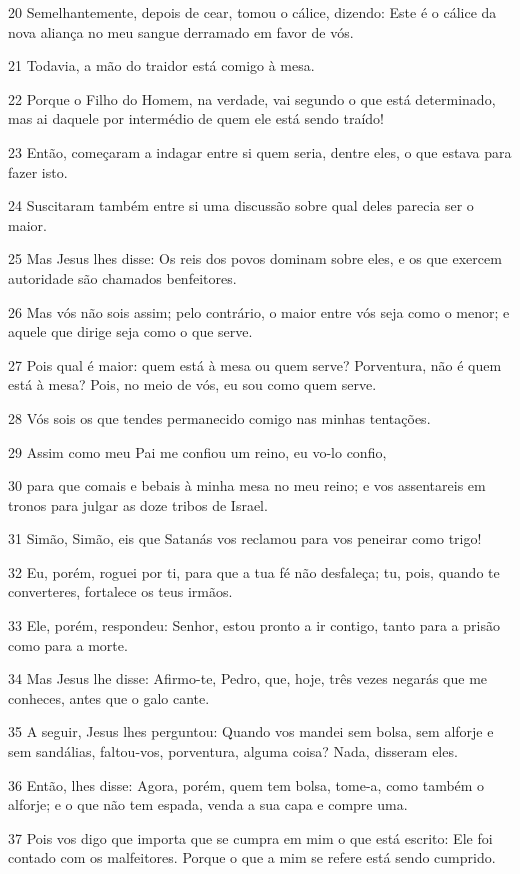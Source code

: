 \par 20 Semelhantemente, depois de cear, tomou o cálice, dizendo: Este é o cálice da nova aliança no meu sangue derramado em favor de vós.
\par 21 Todavia, a mão do traidor está comigo à mesa.
\par 22 Porque o Filho do Homem, na verdade, vai segundo o que está determinado, mas ai daquele por intermédio de quem ele está sendo traído!
\par 23 Então, começaram a indagar entre si quem seria, dentre eles, o que estava para fazer isto.
\par 24 Suscitaram também entre si uma discussão sobre qual deles parecia ser o maior.
\par 25 Mas Jesus lhes disse: Os reis dos povos dominam sobre eles, e os que exercem autoridade são chamados benfeitores.
\par 26 Mas vós não sois assim; pelo contrário, o maior entre vós seja como o menor; e aquele que dirige seja como o que serve.
\par 27 Pois qual é maior: quem está à mesa ou quem serve? Porventura, não é quem está à mesa? Pois, no meio de vós, eu sou como quem serve.
\par 28 Vós sois os que tendes permanecido comigo nas minhas tentações.
\par 29 Assim como meu Pai me confiou um reino, eu vo-lo confio,
\par 30 para que comais e bebais à minha mesa no meu reino; e vos assentareis em tronos para julgar as doze tribos de Israel.
\par 31 Simão, Simão, eis que Satanás vos reclamou para vos peneirar como trigo!
\par 32 Eu, porém, roguei por ti, para que a tua fé não desfaleça; tu, pois, quando te converteres, fortalece os teus irmãos.
\par 33 Ele, porém, respondeu: Senhor, estou pronto a ir contigo, tanto para a prisão como para a morte.
\par 34 Mas Jesus lhe disse: Afirmo-te, Pedro, que, hoje, três vezes negarás que me conheces, antes que o galo cante.
\par 35 A seguir, Jesus lhes perguntou: Quando vos mandei sem bolsa, sem alforje e sem sandálias, faltou-vos, porventura, alguma coisa? Nada, disseram eles.
\par 36 Então, lhes disse: Agora, porém, quem tem bolsa, tome-a, como também o alforje; e o que não tem espada, venda a sua capa e compre uma.
\par 37 Pois vos digo que importa que se cumpra em mim o que está escrito: Ele foi contado com os malfeitores. Porque o que a mim se refere está sendo cumprido.
